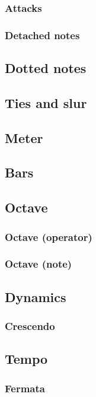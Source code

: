 \documentclass{article}
\begin{document}
\subsubsection{Attacks}
\subsubsection{Detached notes}

\subsection{Dotted notes}

\subsection{Ties and slur}

\subsection{Meter}

\subsection{Bars}

\subsection{Octave}
\subsubsection{Octave (operator)}
\subsubsection{Octave (note)}

\subsection{Dynamics}
\subsubsection{Crescendo}

\subsection{Tempo}
\subsubsection{Fermata}
\end{document}
